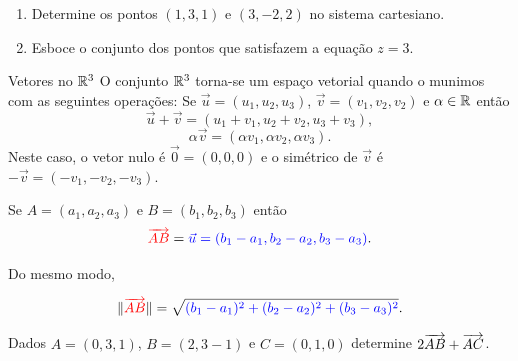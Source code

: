 \begin{frame}[label=vetores]

\begin{exe}
\begin{enumerate}
\item Determine os pontos $(1,3,1)$ e $(3,-2,2)$ no sistema cartesiano.
\item Esboce o conjunto dos pontos que satisfazem a equação $z=3$.
\end{enumerate}
\end{exe}


\end{frame}


\begin{frame}[label=vetores]{Vetores no $\mathbb{R}^3$}
O conjunto $\mathbb{R}^3$ torna-se um espaço vetorial quando o munimos com as seguintes  operações: Se $\vec{u}=(u_1,u_2,u_3)$,  $\vec{v}=(v_1,v_2,v_2)$ e $\alpha\in \mathbb{R}$ então
\[\vec{u}+\vec{v}=(u_1+v_1,u_2+v_2,u_3+v_3),\]
\[\alpha \vec{v}=(\alpha v_1,\alpha v_2,\alpha v_3).\]
Neste caso, o {\color{blue}vetor nulo} é $\vec{0}=(0,0,0)$ e o {\color{blue}simétrico} de $\vec{v}$ é  $-\vec{v}=(-v_1,-v_2,-v_3)$.

\begin{center}
\begin{minipage}{0.7\textwidth}
\begin{block}{}
Se {\color{red}$A=(a_1,a_2,a_3)$} e {\color{red}$B=(b_1,b_2,b_3)$} então
\[{\color{red}\overrightarrow{AB}}={\color{blue}\vec{u}=(b_1-a_1,b_2-a_2,b_3-a_3)}.\]
\end{block}
\end{minipage}
\end{center}
\end{frame}


\begin{frame}[label=vetores]
Do mesmo modo,
\begin{center}
\begin{minipage}{0.7\textwidth}
\begin{block}{}
\[\|{\color{red}\overrightarrow{AB}}\|=\sqrt{{\color{blue}(b_1-a_1)^2+(b_2-a_2)^2 +(b_3-a_3)^2}}.\]
\end{block}
\end{minipage}
\end{center}


\begin{exe}
Dados $A=(0,3,1)$, $B=(2,3-1)$ e $C=(0,1,0)$ determine $2\overrightarrow{AB}+\overrightarrow{AC}$.
\end{exe}


\end{frame}


